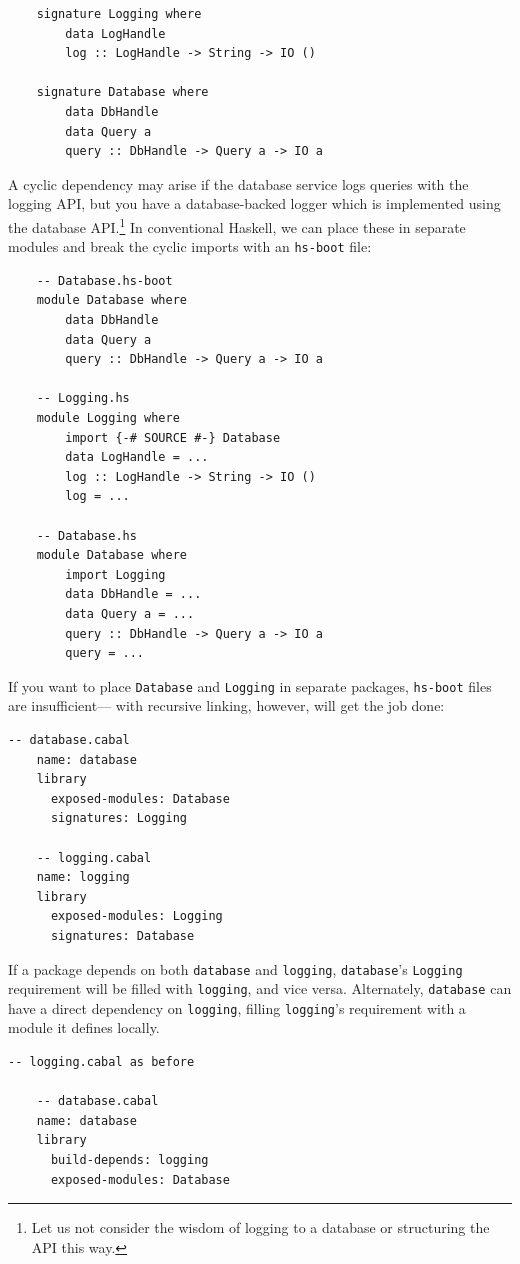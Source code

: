 \begin{lstlisting}
    signature Logging where
        data LogHandle
        log :: LogHandle -> String -> IO ()

    signature Database where
        data DbHandle
        data Query a
        query :: DbHandle -> Query a -> IO a
\end{lstlisting}
%
A cyclic dependency may arise if the database service logs queries with
the logging API, but you have a database-backed logger which is
implemented using the database API\@.\footnote{Let us not consider the
wisdom of logging to a database or structuring the API this way.}  In
conventional Haskell, we can place these in separate modules and break
the cyclic imports with an \verb|hs-boot| file:

\begin{lstlisting}
    -- Database.hs-boot
    module Database where
        data DbHandle
        data Query a
        query :: DbHandle -> Query a -> IO a

    -- Logging.hs
    module Logging where
        import {-# SOURCE #-} Database
        data LogHandle = ...
        log :: LogHandle -> String -> IO ()
        log = ...

    -- Database.hs
    module Database where
        import Logging
        data DbHandle = ...
        data Query a = ...
        query :: DbHandle -> Query a -> IO a
        query = ...
\end{lstlisting}
%
If you want to place \verb|Database| and \verb|Logging| in separate
packages, \verb|hs-boot| files are insufficient---\Backpack{} with
recursive linking, however, will get the job done:

\begin{lstlisting}[language=Cabal]
    -- database.cabal
    name: database
    library
      exposed-modules: Database
      signatures: Logging

    -- logging.cabal
    name: logging
    library
      exposed-modules: Logging
      signatures: Database
\end{lstlisting}
%
If a package depends on both \verb|database| and \verb|logging|,
\verb|database|'s \verb|Logging| requirement will be filled with \verb|logging|,
and vice versa.  Alternately, \verb|database| can have a direct
dependency on \verb|logging|, filling \verb|logging|'s requirement with a module
it defines locally.

\begin{lstlisting}[language=Cabal]
    -- logging.cabal as before

    -- database.cabal
    name: database
    library
      build-depends: logging
      exposed-modules: Database
\end{lstlisting}

